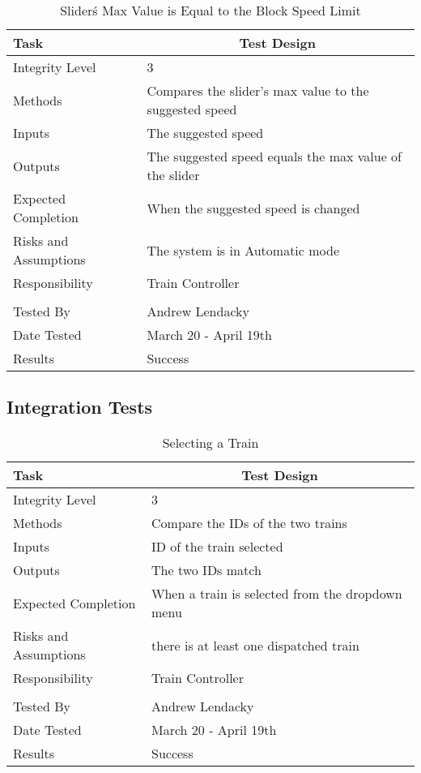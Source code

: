 \documentclass[]{article}
\begin{document}
\begin{table}[H]
	\centering
	\caption{Slider\'s Max Value is Equal to the Block Speed Limit}
	\begin{tabular}{|l|l|}
		\hline
		Task & \multicolumn{1}{c|}{Test Design} \\ \hline
		Integrity Level & 3 \\ \hline
		Methods & Compares the slider's max value to the suggested speed\\ \hline
		Inputs & The suggested speed\\ \hline
		Outputs & The suggested speed equals the max value of the slider \\ \hline
		Expected Completion & When the suggested speed is changed\\ \hline
		Risks and Assumptions & The system is in Automatic mode \\ \hline
		Responsibility &  Train Controller\\ \hline
			\\ \hline
		Tested By   &  Andrew Lendacky\\	\hline
		Date Tested & \parbox[t]{10cm}{March 20 - April 19th}\\ \hline
		Results & Success\\ \hline
	\end{tabular}
\end{table}

\subsection{Integration Tests}

\begin{table}[H]
	\centering
	\caption{Selecting a Train}
	\begin{tabular}{|l|l|}
		\hline
		Task & \multicolumn{1}{c|}{Test Design} \\ \hline
		Integrity Level & 3 \\ \hline
		Methods & Compare the IDs of the two trains\\ \hline
		Inputs & ID of the train selected \\ \hline
		Outputs &  The two IDs match\\ \hline
		Expected Completion & When a train is selected from the dropdown menu\\ \hline
		Risks and Assumptions & there is at least one dispatched train\\ \hline
		Responsibility & Train Controller\\ \hline
			\\ \hline
		Tested By   &  Andrew Lendacky\\	\hline
		Date Tested & \parbox[t]{10cm}{March 20 - April 19th}\\ \hline
		Results & Success\\ \hline
	\end{tabular}
\end{table}
\end{document}
